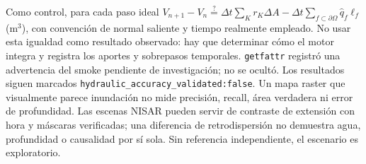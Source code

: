 \documentclass[11pt,a4paper]{article}
\begin{document}
Como control, para cada paso ideal $V_{n+1}-V_n\stackrel{?}{=}\Delta t\sum_Kr_K\Delta A-\Delta t\sum_{f\subset\partial\Omega}\widehat q_f\ell_f$ (m$^3$), con convención de normal saliente y tiempo realmente empleado. No usar esta igualdad como resultado observado: hay que determinar cómo el motor integra y registra los aportes y sobrepasos temporales. \texttt{getfattr} registró una advertencia del smoke pendiente de investigación; no se ocultó. Los resultados siguen marcados \texttt{hydraulic\_accuracy\_validated:false}. Un mapa raster que visualmente parece inundación no mide precisión, recall, área verdadera ni error de profundidad. Las escenas NISAR pueden servir de contraste de extensión con hora y máscaras verificadas; una diferencia de retrodispersión no demuestra agua, profundidad o causalidad por sí sola. Sin referencia independiente, el escenario es exploratorio.
\end{document}
